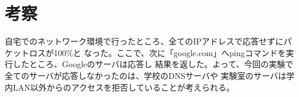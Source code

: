 \documentclass[dvipdfmx,autodetect-engine,titlepage]{jsarticle}
\begin{document}
\section{考察}
自宅でのネットワーク環境で行ったところ、全てのIPアドレスで応答せずにパケットロスが100\%と
なった。ここで、次に「google.com」へpingコマンドを実行したところ、Googleのサーバは応答し
結果を返した。よって、今回の実験で全てのサーバが応答しなかったのは、学校のDNSサーバや
実験室のサーバは学内LAN以外からのアクセスを拒否していることが考えられる。
\end{document}
